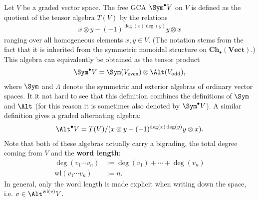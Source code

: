     \begin{example}\label{hda:symmetric_algebra}
        Let $V$ be a graded vector space. The free GCA $\Sym^\bullet V$ on $V$ is defined as the quotient of the tensor algebra $T(V)$ by the relations
        \begin{gather}
            x\otimes y - (-1)^{\deg(x)\deg(y)}y\otimes x
        \end{gather}
        ranging over all homogeneous elements $x,y\in V$. (The notation stems from the fact that it is inherited from the symmetric monoidal structure on $\mathbf{Ch}_\bullet(\mathbf{Vect})$.) This algebra can equivalently be obtained as the tensor product
        \begin{gather}
            \Sym^\bullet V = \Sym(V_\mathrm{even})\otimes\Alt(V_\mathrm{odd}),
        \end{gather}
        where $\Sym$ and $\Lambda$ denote the symmetric and exterior algebras of ordinary vector spaces. It it not hard to see that this definition combines the definitions of $\Sym$ and $\Alt$ (for this reason it is sometimes also denoted by $\Sym^\bullet V$). A similar definition gives a graded alternating algebra:
        \begin{gather}
            \Alt^\bullet V = T(V)/(x\otimes y - (-1)^{\deg(x)\deg(y)}y\otimes x).
        \end{gather}
        Note that both of these algebras actually carry a bigrading, the total degree coming from $V$ and the \textbf{word length}:
        \begin{align}
            \deg(v_1\cdots v_n) &:= \deg(v_1)+\cdots+\deg(v_n)\\
            \mathrm{wl}(v_1\cdots v_n) &:= n.
        \end{align}
        In general, only the word length is made explicit when writing down the space, i.e. $v\in\Alt^{\mathrm{wl}(v)}V$.
    \end{example}
